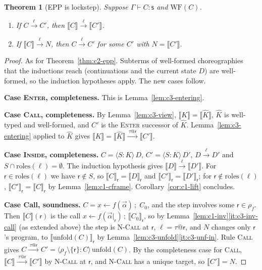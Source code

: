\documentclass[11pt]{report}
\makeatletter
\theoremstyle{plain}
\newtheorem{theorem}{Theorem}[chapter]
\theoremstyle{definition}
\theoremstyle{remark}
\newcommand{\rr}{\mathsf{r}}
\newcommand{\sr}{\mathsf{s}}
\newcommand{\bind}[3]{#1 \leftarrow #2\,;\;#3}
\newcommand{\rt}[3]{\langle #1 : #2\rangle\,#3}
\newcommand{\unfold}[1]{\mathrm{unfold}(#1)}
\newcommand{\roles}[1]{\mathrm{roles}(#1)}
\newcommand{\WF}{\mathrm{WF}}
\newcommand{\tauat}[1]{\tau\mathord{@}#1}
\newcommand{\lto}[1]{\xrightarrow{\;#1\;}}
\newcommand{\proj}[2]{\llbracket #1 \rrbracket_{#2}}
\newcommand{\projn}[1]{\llbracket #1 \rrbracket}
\newcommand{\rn}[1]{{\normalfont\scshape #1}}
\newcommand{\case}[1]{\medskip\noindent\textbf{Case #1.}\;}
\makeatother
\begin{document}
\begin{theorem}[EPP is lockstep]\label{thm:c3-epp}
  Suppose $\Gamma\vdash C:\sr$ and $\WF(C)$.
  \begin{enumerate}[label=(\arabic*),nosep]
  \item\label{it:c3-complete} If $C\lto{\ell}C'$, then $\projn{C}\lto{\ell}\projn{C'}$.
  \item\label{it:c3-sound} If $\projn{C}\lto{\ell}N$, then $C\lto{\ell}C'$ for
    some $C'$ with $N=\projn{C'}$.
  \end{enumerate}
\end{theorem}
\begin{proof}
  As for Theorem~\ref{thm:c2-epp}.  Subterms of well-formed choreographies
  that the inductions reach (continuations and the current state $D$) are
  well-formed, so the induction hypotheses apply.  The new cases follow.

  \case{\rn{Enter}, completeness}
  This is Lemma~\ref{lem:c3-entering}.

  \case{\rn{Call}, completeness}
  By Lemma~\ref{lem:c3-view}, $\projn{K}=\projn{\widehat{K}}$, $\widehat{K}$ is well-typed and
  well-formed, and $C'$ is the \rn{Enter} successor of $\widehat{K}$.
  Lemma~\ref{lem:c3-entering} applied to $\widehat{K}$ gives
  $\projn{K}=\projn{\widehat{K}}\lto{\tauat{\rr}}\projn{C'}$.

  \case{\rn{Inside}, completeness}
  $C=\rt{S}{K}{D}$, $C'=\rt{S}{K}{D'}$, $D\lto{\ell}D'$ and
  $S\cap\roles{\ell}=\emptyset$.  The induction hypothesis gives
  $\projn{D}\lto{\ell}\projn{D'}$.  For $\rr\in\roles{\ell}$ we have $\rr\notin S$,
  so $\proj{C}{\rr}=\proj{D}{\rr}$ and $\proj{C'}{\rr}=\proj{D'}{\rr}$; for
  $\rr\notin\roles{\ell}$, $\proj{C'}{\rr}=\proj{C}{\rr}$ by
  Lemma~\ref{lem:c1-cframe}.  Corollary~\ref{cor:c1-lift} concludes.

  \case{Call, soundness}
  $C=\bind{x}{f(\vec\alpha)}{C_0}$, and the step involves some
  $\rr\in\rho_f$.  Then $\projn{C}(\rr)$ is the call $x\leftarrow
  f(\vec\alpha|_\rr)\,;\,\proj{C_0}{\rr}$, so by
  Lemma~\ref{lem:c1-inv}\ref{it:c3-inv-call} (as extended above) the step is \rn{N-Call} at $\rr$,
  $\ell=\tauat{\rr}$, and $N$ changes only $\rr$'s program, to
  $\proj{\unfold{C}}{\rr}$ by Lemma~\ref{lem:c3-unfold}\ref{it:c3-unf-in}.
  Rule \rn{Call} gives $C\lto{\tauat{\rr}}C'=\rt{\rho_f\setminus\{\rr\}}{C}{\unfold{C}}$.
  By the completeness case for \rn{Call}, $\projn{C}\lto{\tauat{\rr}}\projn{C'}$
  by \rn{N-Call} at $\rr$, and \rn{N-Call} has a unique target, so
  $\projn{C'}=N$.


\end{proof}
\end{document}
